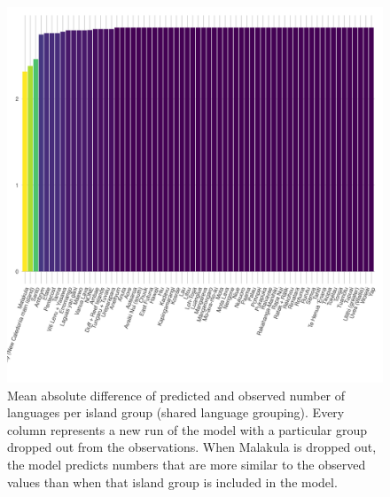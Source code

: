 \documentclass[unnumsec,webpdf,modern,medium]{oup-authoring-template}
\begin{document}
\begin{appendices}
\begin{figure}[ht]
\includegraphics[width=\textwidth]{brms_medium_dropped_out_plot_diff.png}
\caption{Mean absolute difference of predicted and observed number of languages per island group (shared language grouping). Every column represents a new run of the model with a particular group dropped out from the observations. When Malakula is dropped out, the model predicts numbers that are more similar to the observed values than when that island group is included in the model.}
\label{brms_medium_dropped_out_plot_diff}
\end{figure}



\end{appendices}
\end{document}
